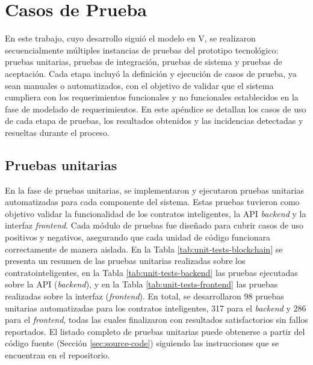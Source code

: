 \chapter[Casos de prueba]{Casos de Prueba}
\label{cp:tests-execution-results}

En este trabajo, cuyo desarrollo siguió el modelo en V, se realizaron secuencialmente múltiples instancias de pruebas del prototipo tecnológico: pruebas unitarias, pruebas de integración, pruebas de sistema y pruebas de aceptación. Cada etapa incluyó la definición y ejecución de casos de prueba, ya sean manuales o automatizados, con el objetivo de validar que el sistema cumpliera con los requerimientos funcionales y no funcionales establecidos en la fase de modelado de requerimientos. En este apéndice se detallan los casos de uso de cada etapa de pruebas, los resultados obtenidos y las incidencias detectadas y resueltas durante el proceso.

\section{Pruebas unitarias}
\label{sec:unit-testing-details}

En la fase de pruebas unitarias, se implementaron y ejecutaron pruebas unitarias automatizadas para cada componente del sistema. Estas pruebas tuvieron como objetivo validar la funcionalidad de los contratos inteligentes, la API \textit{backend} y la interfaz \textit{frontend}. Cada módulo de pruebas fue diseñado para cubrir casos de uso positivos y negativos, asegurando que cada unidad de código funcionara correctamente de manera aislada. En la Tabla \ref{tab:unit-tests-blockchain} se presenta un resumen de las pruebas unitarias realizadas sobre los \glspl{contratointeligente}, en la Tabla \ref{tab:unit-tests-backend} las pruebas ejecutadas sobre la API (\textit{\gls{backend}}), y en la Tabla \ref{tab:unit-tests-frontend} las pruebas realizadas sobre la interfaz (\textit{\gls{frontend}}). En total, se desarrollaron 98 pruebas unitarias automatizadas para los contratos inteligentes, 317 para el \textit{backend} y 286 para el \textit{frontend}, todas las cuales finalizaron con resultados satisfactorios sin fallos reportados. El listado completo de pruebas unitarias puede obtenerse a partir del código fuente (Sección \ref{sec:source-code}) siguiendo las instrucciones que se encuentran en el repositorio.

